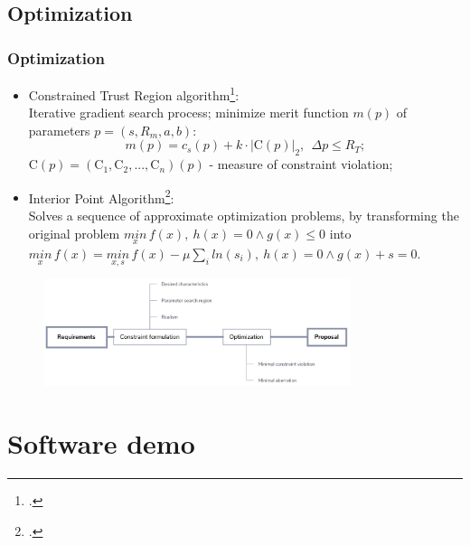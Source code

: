 \documentclass[10pt]{beamer}
\begin{document}
\subsection{Optimization}
\begin{frame}
  \frametitle{Optimization}
  \begin{itemize}
    \item Constrained Trust Region algorithm\footcite{scipyctr}:\\
      Iterative gradient search process; minimize merit function $m(p)$ of parameters $p = (s, R_m, a, b)$:
      \[
      m(p) = c_s(p) + k \cdot |\text{C}(p)|_2,\ \ \Delta p \leq R_T;
      \]
      C$(p) = (\text{C}_1,\text{C}_2,...,\text{C}_n)(p)$ - measure of constraint violation;
    \item Interior Point Algorithm\footcite{sqp}:\\
    Solves a sequence of approximate optimization problems, by transforming the original problem $\underset{x}{min}\,f\left(x\right),\:h\left(x\right)=0\wedge g\left(x\right)\leq0$ into $\underset{x}{min}\,f\left(x\right)=\underset{x,s}{min}\,f\left(x\right)-\mu\underset{i}{\sum}ln\left(s_{i}\right),\:h\left(x\right)=0\wedge g\left(x\right)+s=0$.
  \end{itemize}
  \vspace{-0.34cm}
  \begin{figure}
    \includegraphics[width=0.8\textwidth]{blok_cxema}
  \end{figure}

\end{frame}


\section{Software demo}
\end{document}
